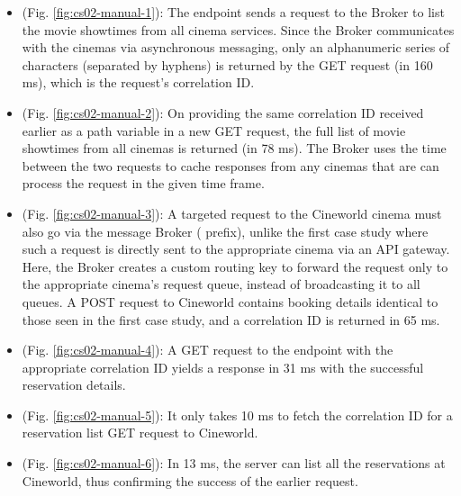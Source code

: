 \begin{itemize}
  \item {} (Fig. \ref{fig:cs02-manual-1}): The  endpoint sends a request to the Broker to list the movie showtimes from all cinema services. Since the Broker communicates with the cinemas via asynchronous messaging, only an alphanumeric series of characters (separated by hyphens) is returned by the GET request (in 160 ms), which is the request's correlation ID.

  \item {} (Fig. \ref{fig:cs02-manual-2}): On providing the same correlation ID received earlier as a path variable in a new GET request, the full list of movie showtimes from all cinemas is returned (in 78 ms). The Broker uses the time between the two requests to cache responses from any cinemas that are can process the request in the given time frame.

  \item {} (Fig. \ref{fig:cs02-manual-3}): A targeted request to the Cineworld cinema must also go via the message Broker ( prefix), unlike the first case study where such a request is directly sent to the appropriate cinema via an API gateway. Here, the Broker creates a custom routing key to forward the request only to the appropriate cinema's request queue, instead of broadcasting it to all queues. A POST request to Cineworld contains booking details identical to those seen in the first case study, and a correlation ID is returned in 65 ms.

  \item {} (Fig. \ref{fig:cs02-manual-4}): A GET request to the  endpoint with the appropriate correlation ID yields a response in 31 ms with the successful reservation details.

  \item {} (Fig. \ref{fig:cs02-manual-5}): It only takes 10 ms to fetch the correlation ID for a reservation list GET request to Cineworld.

  \item {} (Fig. \ref{fig:cs02-manual-6}): In 13 ms, the server can list all the reservations at Cineworld, thus confirming the success of the earlier  request.
\end{itemize}

